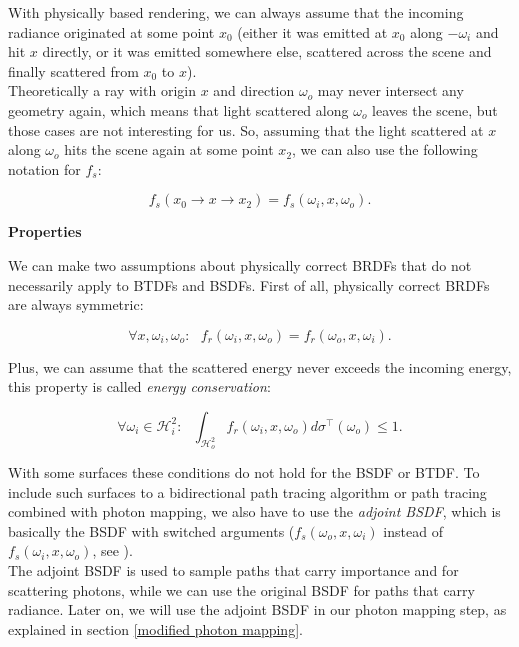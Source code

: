With physically based rendering, we can always assume that the incoming radiance originated at some point $x_0$ (either it was emitted at $x_0$ along $-\omega_i$ and hit $x$ directly, or it was emitted somewhere else, scattered across the scene and finally scattered from $x_0$ to $x$).\\
Theoretically a ray with origin $x$ and direction $\omega_o$ may never intersect any geometry again, which means that light scattered along $\omega_o$ leaves the scene, but those cases are not interesting for us. So, assuming that the light scattered at $x$ along $\omega_o$ hits the scene again at some point $x_2$, we can also use the following notation for $f_s$:

\begin{equation}
\label{fspoint}
f_s(x_0 \rightarrow x \rightarrow x_2) = f_s(\omega_i,x,\omega_o).
\end{equation}

\textbf{Properties}

We can make two assumptions about physically correct BRDFs that do not necessarily apply to BTDFs and BSDFs. First of all, physically correct BRDFs are always symmetric:

\begin{equation*}
\forall x, \omega_i,\omega_o: \text{ } f_r(\omega_i, x, \omega_o) = f_r(\omega_o, x, \omega_i).
\end{equation*}

Plus, we can assume that the scattered energy never exceeds the incoming energy, this property is called \emph{energy conservation}:

\begin{equation*}
\forall \omega_i \in \mathcal{H}_i^2: \text{ } \int_{\mathcal{H}_o^2}f_r(\omega_i , x, \omega_o) d\sigma^\top(\omega_o) \leq 1 .
\end{equation*}

With some surfaces these conditions do not hold for the BSDF or BTDF. To include such surfaces to a bidirectional path tracing algorithm or path tracing combined with photon mapping, we also have to use the \emph{adjoint BSDF}, which is basically the BSDF with switched arguments ($f_s(\omega_o,x,\omega_i)$ instead of $f_s(\omega_i,x,\omega_o)$, see \cite[chapter 3.7.3 - 3.7.6]{veachdiss}).\\
The adjoint BSDF is used to sample paths that carry importance and for scattering photons, while we can use the original BSDF for paths that carry radiance. Later on, we will use the adjoint BSDF in our photon mapping step, as explained in section \ref{modified photon mapping}.\\


